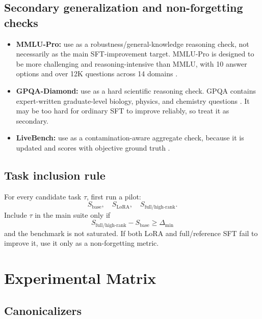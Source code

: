 \documentclass[11pt]{article}
\begin{document}
\subsection{Secondary generalization and non-forgetting checks}

\begin{itemize}[leftmargin=*]
    \item \textbf{MMLU-Pro:} use as a robustness/general-knowledge reasoning check, not necessarily as the main SFT-improvement target. MMLU-Pro is designed to be more challenging and reasoning-intensive than MMLU, with 10 answer options and over 12K questions across 14 domains \cite{wang2024mmlupro}.
    \item \textbf{GPQA-Diamond:} use as a hard scientific reasoning check. GPQA contains expert-written graduate-level biology, physics, and chemistry questions \cite{rein2023gpqa}. It may be too hard for ordinary SFT to improve reliably, so treat it as secondary.
    \item \textbf{LiveBench:} use as a contamination-aware aggregate check, because it is updated and scores with objective ground truth \cite{white2024livebench}.
\end{itemize}

\subsection{Task inclusion rule}

For every candidate task $\tau$, first run a pilot:
\[
    S_{\mathrm{base}},
    \quad
    S_{\mathrm{LoRA}},
    \quad
    S_{\mathrm{full/high\text{-}rank}}.
\]
Include $\tau$ in the main suite only if
\[
    S_{\mathrm{full/high\text{-}rank}}-S_{\mathrm{base}}\ge \Delta_{\min}
\]
and the benchmark is not saturated. If both LoRA and full/reference SFT fail to improve it, use it only as a non-forgetting metric.

\section{Experimental Matrix}

\subsection{Canonicalizers}
\end{document}

